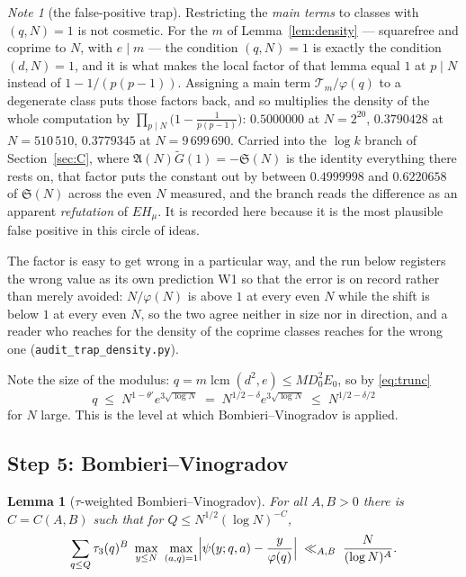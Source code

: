 \documentclass[11pt,a4paper]{article}
\theoremstyle{plain}
\newtheorem{lemma}[theorem]{Lemma}
\theoremstyle{definition}
\theoremstyle{remark}
\newtheorem{note}[theorem]{Note}
\renewcommand{\SS}{\mathfrak{S}}
\newcommand{\AAA}{\mathfrak{A}}
\newcommand{\Tcut}{\mathcal T}
\DeclareMathOperator{\lcm}{lcm}
\begin{document}
\begin{note}[the false-positive trap]\label{note:trap}
Restricting the \emph{main terms} to classes with $(q,N)=1$ is not
cosmetic. For the $m$ of Lemma~\ref{lem:density} --- squarefree and
coprime to $N$, with $e\mid m$ --- the condition $(q,N)=1$ is exactly
the condition $(d,N)=1$, and it is what makes the local factor of that
lemma equal $1$ at $p\mid N$ instead of $1-1/(p(p-1))$. Assigning a
main term $\Tcut_m/\varphi(q)$ to a degenerate class puts those factors
back, and so multiplies the density of the whole computation by
$\prod_{p\mid N}\bigl(1-\tfrac{1}{p(p-1)}\bigr)$: $0.5000000$ at
$N=2^{20}$, $0.3790428$ at $N=510\,510$, $0.3779345$ at
$N=9\,699\,690$. Carried into the $\log k$ branch of
Section~\ref{sec:C}, where $\AAA(N)\widetilde G(1)=-\SS(N)$ is the
identity everything there rests on, that factor puts the constant out
by between $0.4999998$ and $0.6220658$ of $\SS(N)$ across the even $N$
measured, and the branch reads the difference as an apparent
\emph{refutation} of $EH_\mu$. It is recorded here because it is the
most plausible false positive in this circle of ideas.

The factor is easy to get wrong in a particular way, and the run below
registers the wrong value as its own prediction W1 so that the error is
on record rather than merely avoided: $N/\varphi(N)$ is above $1$ at
every even $N$ while the shift is below $1$ at every even $N$, so the
two agree neither in size nor in direction, and a reader who reaches
for the density of the coprime classes reaches for the wrong one
(\texttt{audit\_trap\_density.py}).
\end{note}

Note the size of the modulus: $q=m\lcm(d^2,e)\le MD_0^2E_0$, so by
\eqref{eq:trunc}
\begin{equation}\label{eq:level}
  q\;\le\;N^{1-\theta'}e^{3\sqrt{\log N}}
   \;=\;N^{1/2-\delta}e^{3\sqrt{\log N}}
  \;\le\;N^{1/2-\delta/2}
\end{equation}
for $N$ large. This is the level at which Bombieri--Vinogradov is
applied.

\subsection{Step 5: Bombieri--Vinogradov}

\begin{lemma}[$\tau$-weighted Bombieri--Vinogradov]\label{lem:BV}
For all $A,B>0$ there is $C=C(A,B)$ such that for
$Q\le N^{1/2}(\log N)^{-C}$,
\[
  \sum_{q\le Q}\tau_3(q)^{B}\ \max_{y\le N}\ \max_{(a,q)=1}
  \Bigl|\psi(y;q,a)-\frac{y}{\varphi(q)}\Bigr|
  \;\ll_{A,B}\;\frac{N}{(\log N)^{A}}.
\]
\end{lemma}
\end{document}
